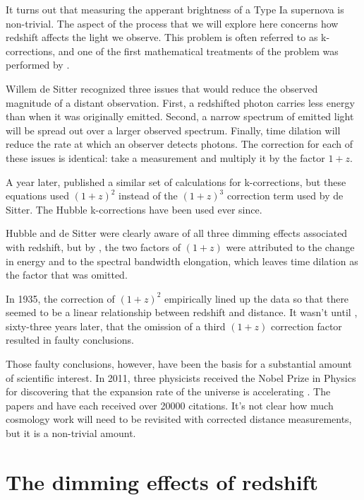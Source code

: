 \documentclass{article}
\begin{document}
It turns out that measuring the apperant brightness of a Type Ia supernova is
non-trivial. The aspect of the process that we will explore here concerns how
redshift affects the light we observe. This problem is often referred to as
k-corrections, and one of the first mathematical treatments of the problem was
performed by \citet{desitter1934}.

Willem de Sitter recognized three issues that would reduce the observed
magnitude of a distant observation. First, a redshifted photon carries less
energy than when it was originally emitted. Second, a narrow spectrum of
emitted light will be spread out over a larger observed spectrum. Finally, time
dilation will reduce the rate at which an observer detects photons. The
correction for each of these issues is identical: take a measurement and
multiply it by the factor $1 + z$.

A year later, \citet{hubble1935} published a similar set of calculations for
k-corrections, but these equations used $(1 + z)^2$ instead of the $(1 + z)^3$
correction term used by de Sitter. The Hubble k-corrections have been used ever
since.

Hubble and de Sitter were clearly aware of all three dimming effects associated
with redshift, but by \citet{oke1968energy}, the two factors of $(1 + z)$ were
attributed to the change in energy and to the spectral bandwidth elongation,
which leaves time dilation as the factor that was omitted.

In 1935, the correction of $(1 + z)^2$ empirically lined up the data so that
there seemed to be a linear relationship between redshift and distance. It
wasn't until \citet{riess1998}, sixty-three years later, that the omission of a
third $(1 + z)$ correction factor resulted in faulty conclusions.

Those faulty conclusions, however, have been the basis for a substantial amount
of scientific interest. In 2011, three physicists received the Nobel Prize in
Physics for discovering that the expansion rate of the universe is accelerating
\citet{straumann2012}. The papers \citet{riess1998} and \citet{perlmutter1999}
have each received over 20000 citations. It's not clear how much cosmology work
will need to be revisited with corrected distance measurements, but it is a
non-trivial amount.

\begin{displayquote}
\end{displayquote}

\section{The dimming effects of redshift}
\end{document}
